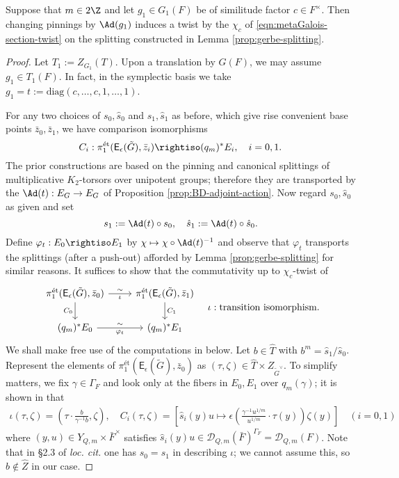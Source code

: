 \documentclass[a4paper,10pt]{article}
\begin{document}
\begin{lemma}\label{prop:variance-gerbe}
	Suppose that $m \in 2\Z$ and let $g_1 \in G_1(F)$ be of similitude factor $c \in F^\times$. Then changing pinnings by $\Ad(g_1)$ induces a twist by the $\chi_c$ of \eqref{eqn:metaGalois-section-twist} on the splitting constructed in Lemma \ref{prop:gerbe-splitting}.
\end{lemma}
\begin{proof}
	Let $T_1 := Z_{G_1}(T)$. Upon a translation by $G(F)$, we may assume $g_1 \in T_1(F)$. In fact, in the symplectic basis we take $g_1 = t := \text{diag}(c, \ldots, c, 1, \ldots, 1)$.
	
	For any two choices of $s_0, \hat{s}_0$ and $s_1, \hat{s}_1$ as before, which give rise convenient base points $\bar{z}_0, \bar{z}_1$, we have comparison isomorphisms
	\[ C_i: \pi_1^{\text{ét}}(\mathsf{E}_\epsilon(\tilde{G}), \bar{z}_i) \rightiso (q_m)^* E_i, \quad i = 0, 1. \]
	The prior constructions are based on the pinning and canonical splittings of multiplicative $K_2$-torsors over unipotent groups; therefore they are transported by the $\Ad(t): E_G \to E_G$ of Proposition \ref{prop:BD-adjoint-action}. Now regard $s_0, \hat{s}_0$ as given and set
	\[ s_1 := \Ad(t) \circ s_0, \quad \hat{s}_1 := \Ad(t) \circ \hat{s}_0. \]
	Define $\varphi_t: E_0 \rightiso E_1$ by $\chi \mapsto \chi \circ \Ad(t)^{-1}$ and observe that $\varphi_t$ transports the splittings (after a push-out) afforded by Lemma \ref{prop:gerbe-splitting} for similar reasons. It suffices to show that the commutativity up to $\chi_c$-twist of
	\begin{equation}\label{eqn:comparison-twist} \begin{tikzcd}
		\pi_1^{\text{ét}}(\mathsf{E}_\epsilon(\tilde{G}), \bar{z}_0) \arrow{r}{\sim}[swap]{\iota} \arrow{d}[swap]{C_0} & \pi_1^{\text{ét}}(\mathsf{E}_\epsilon(\tilde{G}), \bar{z}_1) \arrow{d}{C_1} \\
		(q_m)^* E_0 \arrow{r}{\sim}[swap]{\varphi_t} & (q_m)^* E_1
	\end{tikzcd} \quad \iota: \text{transition isomorphism}. \end{equation}
	We shall make free use of the computations in \cite{Weis17b} below. Let $b \in \hat{T}$ with $b^m = \hat{s}_1/\hat{s}_0$. Represent the elements of $\pi_1^{\text{ét}}(\mathsf{E}_\epsilon(\tilde{G}), \bar{z}_0)$ as $(\tau, \zeta) \in \hat{T} \times Z_{\tilde{G}^\vee}$. To simplify matters, we fix $\gamma \in \Gamma_F$ and look only at the fibers in $E_0, E_1$ over $q_m(\gamma)$; it is shown in \cite[\S\S 2.2--2.3]{Weis17b} that
	\begin{gather*}
		\iota(\tau, \zeta) = \left( \tau \cdot \frac{b}{\gamma^{-1} b}, \zeta\right), \quad C_i(\tau, \zeta) = \left[ \hat{s}_i(y)u \mapsto \epsilon\left( \frac{\gamma^{-1} u^{1/m}}{u^{1/m}} \cdot \tau(y) \right) \zeta(y) \right] \quad (i=0,1)
	\end{gather*}
	where $(y, u) \in Y_{Q,m} \times \bar{F}^\times$ satisfies $\hat{s}_i(y)u \in \mathcal{D}_{Q,m}(\bar{F})^{\Gamma_F} = \mathcal{D}_{Q,m}(F)$. Note that in \S 2.3 of \textit{loc. cit.} one has $s_0 = s_1$ in describing $\iota$; we cannot assume this, so $b \notin \hat{Z}$ in our case.
	

\end{proof}
\end{document}
